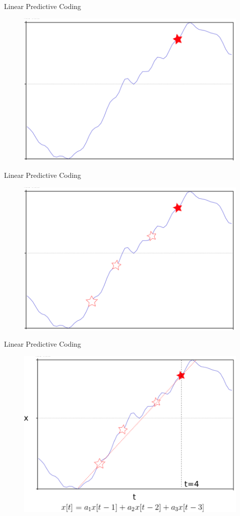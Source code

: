 \documentclass{beamer}
\begin{document}
\begin{frame}
Linear Predictive Coding
\begin{figure}
\includegraphics[scale=0.5]{target_sample.png}
\end{figure}
\end{frame}
\begin{frame}
Linear Predictive Coding
\begin{figure}
\includegraphics[scale=0.5]{target_plus_coefs.png}
\end{figure}
\end{frame}
\begin{frame}
Linear Predictive Coding
\begin{figure}
\includegraphics[scale=0.5]{regression.png}
\end{figure}
\end{frame}
\end{document}
